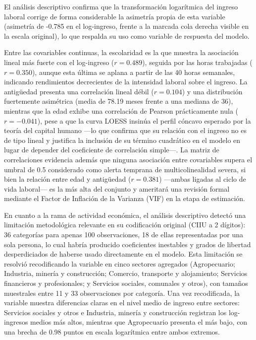 \documentclass[
  spanish,
  letterpaper,
  DIV=11,
  numbers=noendperiod]{scrartcl}
\begin{document}
El análisis descriptivo confirma que la transformación logarítmica del
ingreso laboral corrige de forma considerable la asimetría propia de
esta variable (asimetría de -0.785 en el log-ingreso, frente a la
marcada cola derecha visible en la escala original), lo que respalda su
uso como variable de respuesta del modelo.

Entre las covariables continuas, la escolaridad es la que muestra la
asociación lineal más fuerte con el log-ingreso (\(r = 0.489\)), seguida
por las horas trabajadas (\(r = 0.350\)), aunque esta última se aplana a
partir de las 40 horas semanales, indicando rendimientos decrecientes de
la intensidad laboral sobre el ingreso. La antigüedad presenta una
correlación lineal débil (\(r = 0.104\)) y una distribución fuertemente
asimétrica (media de 78.19 meses frente a una mediana de 36), mientras
que la edad exhibe una correlación de Pearson prácticamente nula
(\(r = -0.041\)), pese a que la curva LOESS insinúa el perfil cóncavo
esperado por la teoría del capital humano ---lo que confirma que su
relación con el ingreso no es de tipo lineal y justifica la inclusión de
su término cuadrático en el modelo en lugar de depender del coeficiente
de correlación simple---. La matriz de correlaciones evidencia además
que ninguna asociación entre covariables supera el umbral de 0.5
considerado como alerta temprana de multicolinealidad severa, si bien la
relación entre edad y antigüedad (\(r = 0.381\)) ---ambas ligadas al
ciclo de vida laboral--- es la más alta del conjunto y ameritará una
revisión formal mediante el Factor de Inflación de la Varianza (VIF) en
la etapa de estimación.

En cuanto a la rama de actividad económica, el análisis descriptivo
detectó una limitación metodológica relevante en su codificación
original (CIIU a 2 dígitos): 36 categorías para apenas 100
observaciones, 18 de ellas representadas por una sola persona, lo cual
habría producido coeficientes inestables y grados de libertad
desperdiciados de haberse usado directamente en el modelo. Esta
limitación se resolvió recodificando la variable en cinco sectores
agregados (Agropecuario; Industria, minería y construcción; Comercio,
transporte y alojamiento; Servicios financieros y profesionales; y
Servicios sociales, comunales y otros), con tamaños muestrales entre 11
y 33 observaciones por categoría. Una vez recodificada, la variable
muestra diferencias claras en el nivel medio de ingreso entre sectores:
Servicios sociales y otros e Industria, minería y construcción registran
los log-ingresos medios más altos, mientras que Agropecuario presenta el
más bajo, con una brecha de 0.98 puntos en escala logarítmica entre
ambos extremos.
\end{document}

